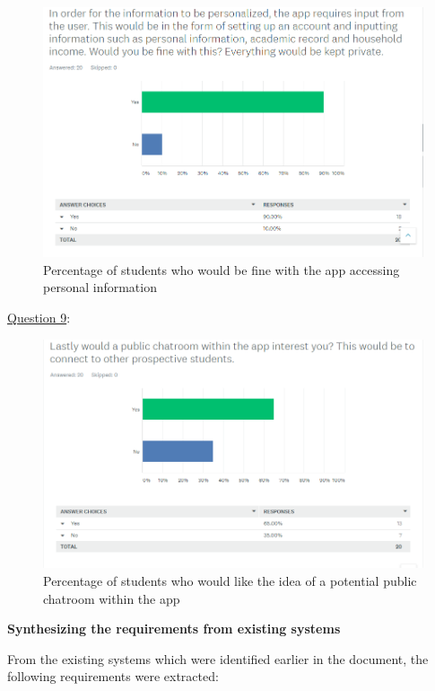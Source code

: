 \documentclass[a4paper, 12pt]{article}
\begin{document}
\begin{figure}[h]
\centering
\includegraphics[scale=0.6]{Q8}
\caption{Percentage of students who would be fine with the app accessing personal information}
\label{fig:7}
\end{figure}

\newpage
\underline{Question 9}:

\begin{figure}[h]
\centering
\includegraphics[scale=0.6]{Q9}
\caption{Percentage of students who would like the idea of a potential public chatroom within the app}
\label{fig:8}
\end{figure} 

\newpage
\textbf{Synthesizing the requirements from existing systems}

From the existing systems which were identified earlier in the document, the following requirements were extracted:
\end{document}
